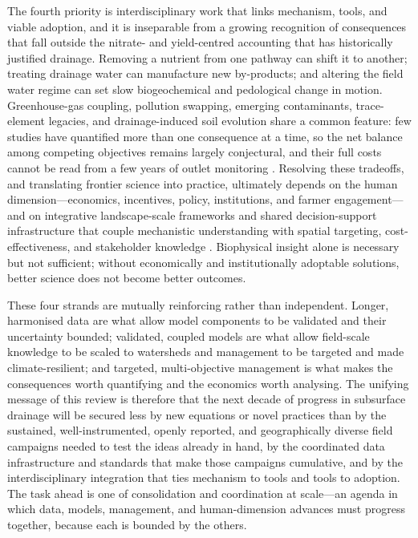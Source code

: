 \documentclass[11pt]{article}
\begin{document}
The fourth priority is interdisciplinary work that links mechanism, tools,
and viable adoption, and it is inseparable from a growing recognition of
consequences that fall outside the nitrate- and yield-centred accounting
that has historically justified drainage. Removing a nutrient from one
pathway can shift it to another; treating drainage water can manufacture new
by-products; and altering the field water regime can set slow biogeochemical
and pedological change in motion. Greenhouse-gas coupling, pollution
swapping, emerging contaminants, trace-element legacies, and
drainage-induced soil evolution share a common feature: few studies have
quantified more than one consequence at a time, so the net balance among
competing objectives remains largely conjectural, and their full costs
cannot be read from a few years of outlet monitoring \parencite{Mitchell2023,Kadlec2012}. Resolving these
tradeoffs, and translating frontier science into practice, ultimately
depends on the human dimension---economics, incentives, policy,
institutions, and farmer engagement---and on integrative landscape-scale
frameworks and shared decision-support infrastructure that couple mechanistic
understanding with spatial targeting, cost-effectiveness, and stakeholder
knowledge \parencite{McLellan2015,Christianson2014}. Biophysical insight alone is necessary but not sufficient; without
economically and institutionally adoptable solutions, better science does not
become better outcomes.

These four strands are mutually reinforcing rather than independent.
Longer, harmonised data are what allow model components to be validated and
their uncertainty bounded; validated, coupled models are what allow
field-scale knowledge to be scaled to watersheds and management to be
targeted and made climate-resilient; and targeted, multi-objective
management is what makes the consequences worth quantifying and the
economics worth analysing. The unifying message of this review is therefore
that the next decade of progress in subsurface drainage will be secured less
by new equations or novel practices than by the sustained, well-instrumented,
openly reported, and geographically diverse field campaigns needed to test
the ideas already in hand, by the coordinated data infrastructure and
standards that make those campaigns cumulative, and by the interdisciplinary
integration that ties mechanism to tools and tools to adoption. The task
ahead is one of consolidation and coordination at scale---an agenda in which
data, models, management, and human-dimension advances must progress
together, because each is bounded by the others.

\printbibliography
\end{document}
